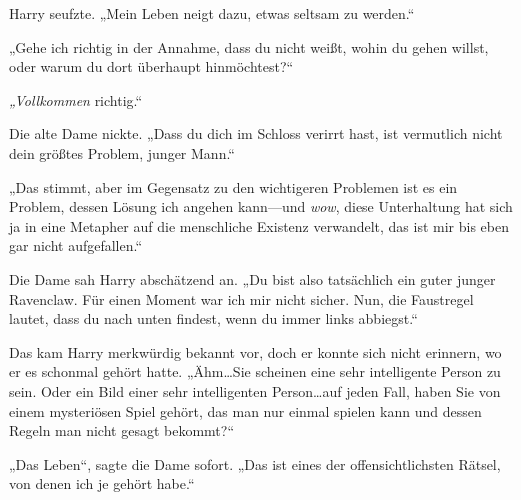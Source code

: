Harry seufzte. „Mein Leben neigt dazu, etwas seltsam zu werden.“

„Gehe ich richtig in der Annahme, dass du nicht weißt, wohin du gehen willst, oder warum du dort überhaupt hinmöchtest?“

\emph{„Vollkommen} richtig.“

Die alte Dame nickte. „Dass du dich im Schloss verirrt hast, ist vermutlich nicht dein größtes Problem, junger Mann.“

„Das stimmt, aber im Gegensatz zu den wichtigeren Problemen ist es ein Problem, dessen Lösung ich angehen kann—und \emph{wow}, diese Unterhaltung hat sich ja in eine Metapher auf die menschliche Existenz verwandelt, das ist mir bis eben gar nicht aufgefallen.“

Die Dame sah Harry abschätzend an. „Du bist also tatsächlich ein guter junger Ravenclaw. Für einen Moment war ich mir nicht sicher. Nun, die Faustregel lautet, dass du nach unten findest, wenn du immer links abbiegst.“

Das kam Harry merkwürdig bekannt vor, doch er konnte sich nicht erinnern, wo er es schonmal gehört hatte. „Ähm…Sie scheinen eine sehr intelligente Person zu sein. Oder ein Bild einer sehr intelligenten Person…auf jeden Fall, haben Sie von einem mysteriösen Spiel gehört, das man nur einmal spielen kann und dessen Regeln man nicht gesagt bekommt?“

„Das Leben“, sagte die Dame sofort. „Das ist eines der offensichtlichsten Rätsel, von denen ich je gehört habe.“


